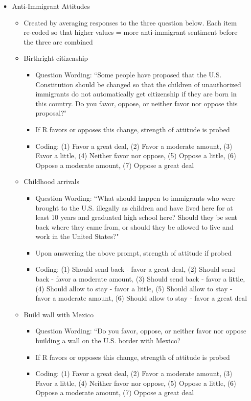 \documentclass[12pt]{article}
\begin{document}
\begin{appendices}
\begin{refsection}
\begin{itemize}
	\item Anti-Immigrant Attitudes
		\begin{itemize}
			\item Created by averaging responses to the three question below. Each item re-coded so that higher values = more anti-immigrant sentiment before the three are combined
			\item Birthright citizenship
			\begin{itemize}
				\item Question Wording: ``Some people have proposed that the U.S. Constitution should be changed so that the children of unauthorized immigrants do not automatically get citizenship if they are born in this country. Do you favor, oppose, or neither favor nor oppose this proposal?"
				\item If R favors or opposes this change, strength of attitude is probed
				\item Coding: (1) Favor a great deal, (2) Favor a moderate amount, (3) Favor a little, (4) Neither favor nor oppose, (5) Oppose a little, (6) Oppose a moderate amount, (7) Oppose a great deal
			\end{itemize}
			\item Childhood arrivals
			\begin{itemize}
				\item Question Wording: ``What should happen to immigrants who were brought to the U.S. illegally as children and have lived here for at least 10 years and graduated high school here? Should they be sent back where they came from, or should they be allowed to live and work in the United States?"
				\item Upon answering the above prompt, strength of attitude if probed
				\item Coding: (1) Should send back - favor a great deal, (2) Should send back - favor a moderate amount, (3) Should send back - favor a little, (4) Should allow to stay - favor a little, (5) Should allow to stay - favor a moderate amount, (6) Should allow to stay - favor a great deal
			\end{itemize}
			\item Build wall with Mexico
			\begin{itemize}
				\item Question Wording: ``Do you favor, oppose, or neither favor nor oppose building a wall on the U.S. border with Mexico?
				\item If R favors or opposes this change, strength of attitude is probed
				\item Coding: (1) Favor a great deal, (2) Favor a moderate amount, (3) Favor a little, (4) Neither favor nor oppose, (5) Oppose a little, (6) Oppose a moderate amount, (7) Oppose a great deal
			\end{itemize}
		\end{itemize}
		

\end{itemize}
\end{refsection}
\end{appendices}
\end{document}
